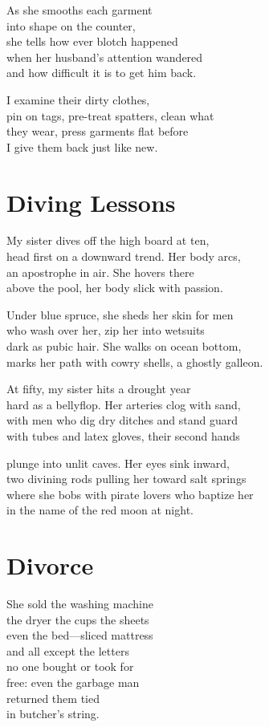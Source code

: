 \documentclass[twoside,10pt]{book}
\begin{document}
As she smooths each garment\\
into shape on the counter,\\
she tells how ever blotch happened\\
when her husband's attention wandered\\
and how difficult it is to get him back.

I examine their dirty clothes,\\
pin on tags, pre-treat spatters, clean what\\
they wear, press garments flat before\\
I give them back just like new.


\clearpage
\section{Diving Lessons}

My sister dives off the high board at ten,\\
head first on a downward trend. Her body arcs,\\
an apostrophe in air. She hovers there\\
above the pool, her body slick with passion.

Under blue spruce, she sheds her skin for men\\
who wash over her, zip her into wetsuits\\
dark as pubic hair. She walks on ocean bottom,\\
marks her path with cowry shells, a ghostly galleon.

At fifty, my sister hits a drought year\\
hard as a bellyflop. Her arteries clog with sand,\\
with men who dig dry ditches and stand guard\\
with tubes and latex gloves, their second hands

plunge into unlit caves. Her eyes sink inward,\\
two divining rods pulling her toward salt springs\\
where she bobs with pirate lovers who baptize her\\
in the name of the red moon at night.


\clearpage
\section{Divorce}

She sold the washing machine\\
the dryer the cups the sheets\\
even the bed---sliced mattress\\
and all except the letters\\
no one bought or took for\\
free: even the garbage man\\
returned them tied\\
in butcher's string.
\end{document}

